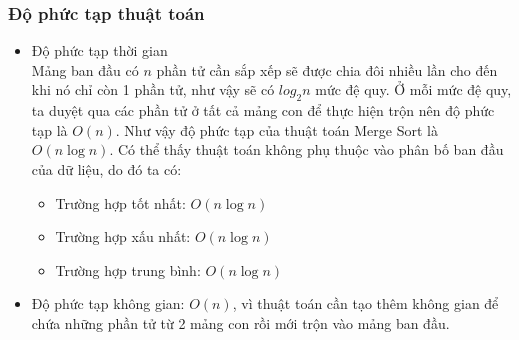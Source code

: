 
\subsubsection{Độ phức tạp thuật toán}

\begin{itemize}
    \item Độ phức tạp thời gian \cite[p.~243--244]{weiss2013} \\
    Mảng ban đầu có $n$ phần tử cần sắp xếp sẽ được chia đôi nhiều lần cho đến khi nó chỉ còn 1 phần tử, như vậy sẽ có $log_2{n}$ mức đệ quy. Ở mỗi mức đệ quy, ta duyệt qua các phần tử ở tất cả mảng con để thực hiện trộn nên độ phức tạp là $O\left(n\right)$. Như vậy độ phức tạp của thuật toán Merge Sort là $O\left(n\log{n}\right)$. Có thể thấy thuật toán không phụ thuộc vào phân bố ban đầu của dữ liệu, do đó ta có:
    \begin{itemize}[label=$\circ$]
        \item Trường hợp tốt nhất: $O\left(n\log{n}\right)$
        \item Trường hợp xấu nhất: $O\left(n\log{n}\right)$
        \item Trường hợp trung bình: $O\left(n\log{n}\right)$ 
    \end{itemize}
    
    \item Độ phức tạp không gian: $O\left(n\right)$, vì thuật toán cần tạo thêm không gian để chứa những phần tử từ 2 mảng con rồi mới trộn vào mảng ban đầu.
\end{itemize}